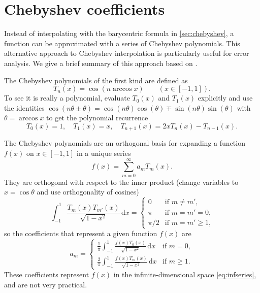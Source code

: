 \documentclass{aa}
\newcommand\diff[1]{\mathrm{d}{#1}}
\begin{document}



\appendix
{} %
\nolinenumbers

\section{Chebyshev coefficients}
\label{sec:coeffs}

Instead of interpolating with the barycentric formula in \cref{sec:chebyshev},
a function can be approximated with a series of Chebyshev polynomials.
This alternative approach to Chebyshev interpolation is particularly useful for error analysis.
We give a brief summary of this approach based on \cite{trefethenApproximationTheoryApproximation2019}.

The Chebyshev polynomials of the first kind are defined as
\begin{equation}
	T_n(x) = \cos(n \arccos x)
	\qquad
	(x \in [-1, 1]).
\label{eq:chebpolydef}
\end{equation}
To see it is really a polynomial,
evaluate $T_0(x)$ and $T_1(x)$ explicitly and use the identities $\cos(n\theta\pm\theta) = \cos(n\theta) \cos(\theta) \mp \sin(n\theta) \sin(\theta)$ with $\theta = \arccos x$ to get the polynomial recurrence%
\begin{equation}
	T_0(x) = 1,
	\quad
	T_1(x) = x,
	\quad
	T_{n+1}(x) = 2 x T_n(x) - T_{n-1}(x).
\label{eq:recurrence}
\end{equation}

The Chebyshev polynomials are an orthogonal basis for expanding a function $f(x)$ on $x \in [-1, 1]$ in a unique series%
\begin{equation}
	f(x) = \sum_{m=0}^\infty a_m T_m(x).
\label{eq:infseries}
\end{equation}
They are orthogonal with respect to the inner product
(change variables to $x = \cos \theta$ and use orthogonality of cosines)
\begin{equation}
	\int_{-1}^1 \frac{T_m(x) T_{m'}(x)}{\sqrt{1-x^2}} \, \diff{x} =
	\begin{cases} 0 & \text{if $m \neq m'$,} \\ \pi & \text{if $m=m'=0$,} \\ \pi/2 & \text{if $m=m' \geq 1$,} \end{cases}
\label{eq:innerprodcont}
\end{equation}
so the coefficients that represent a given function $f(x)$ are
\begin{equation}
	a_m = \begin{cases}
		\displaystyle \frac{1}{\pi} \int_{-1}^1 \frac{f(x) T_0(x)}{\sqrt{1-x^2}} \, \diff{x} & \text{if $m = 0$}, \\
		\displaystyle \frac{2}{\pi} \int_{-1}^1 \frac{f(x) T_m(x)}{\sqrt{1-x^2}} \, \diff{x} & \text{if $m \geq 1$}.
	\end{cases}
\label{eq:coeffscont}%
\end{equation}
These coefficients represent $f(x)$ in the infinite-dimensional space \eqref{eq:infseries},
and are not very practical.
\end{document}
